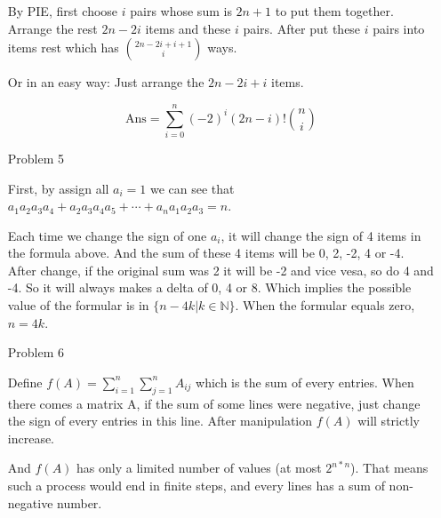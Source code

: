 \documentclass{article}
\begin{document}
\begin{itemize}
        By PIE, first choose $i$ pairs whose sum is $2n + 1$ to put them together.
        Arrange the rest $2n - 2i$ items and these $i$ pairs. After put these $i$ pairs
        into items rest which has ${2n - 2i + i + 1 \choose i}$ ways.

        Or in an easy way:
        Just arrange the $2n - 2i + i$ items.

        $$\text{Ans} = \sum_{i=0}^{n}(-2)^i (2n - i)! {n \choose i}$$

    \item[Problem 5]

        First, by assign all $a_i = 1$ we can see that $a_1a_2a_3a_4 + a_2a_3a_4a_5 + \cdots + a_na_1a_2a_3 = n$.
        
        Each time we change the sign of one $a_i$, it will change the sign of 4 items in the formula above.
        And the sum of these 4 items will be 0, 2, -2, 4 or -4. After change, if the original sum was 2 it will be
        -2 and vice vesa, so do 4 and -4. So it will always makes a delta of 0, 4 or 8. Which implies the possible value
        of the formular is in $\{n - 4k | k \in \mathbb{N}\}$. When the formular equals zero, $n = 4k$.

    \item[Problem 6]

        Define $f(A) = \sum_{i=1}^{n} \sum_{j=1}^{n} A_{ij}$ which is the sum of every entries.
        When there comes a matrix A, if the sum of some lines were negative, just change the sign
        of every entries in this line. After manipulation $f(A)$ will strictly increase.

        And $f(A)$ has only a limited number of values (at most $2^{n*n}$). That means such a process would end in 
        finite steps, and every lines has a sum of non-negative number.

\end{itemize}
\end{document}
